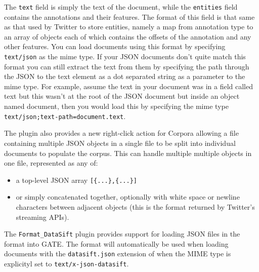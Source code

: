 The \texttt{text} field is simply the text of the document, while the
\texttt{entities} field contains the annotations and their features. The
format of this field is that same as that used by Twitter to store entities,
namely a map from annotation type to an array of objects each of which contains
the offsets of the annotation and any other features. You can load documents
using this format by specifying \texttt{text/json} as the mime type. If your
JSON documents don't quite match this format you can still extract the text
from them by specifying the path through the JSON to the text element as a
dot separated string as a parameter to the mime type. For example, assume
the text in your document was in a field called text but this wasn't at the
root of the JSON document but inside an object named document, then you would
load this by specifying the mime type \texttt{text/json;text-path=document.text}.

The plugin also provides a new right-click action for Corpora allowing a file
containing multiple JSON objects in a single file to be split into individual
documents to populate the corpus. This can handle multiple multiple objects
in one file, represented as any of:
\begin{itemize}
\item a top-level JSON array \verb![{...},{...}]!
\item or simply concatenated together, optionally with white space or newline
  characters between adjacent objects (this is the format returned by Twitter's
  streaming APIs).
\end{itemize}

%
%
The \verb!Format_DataSift! plugin provides support for loading JSON files in the
 format into GATE. The format will
automatically be used when loading documents with the \verb!datasift.json!
extension of when the MIME type is explicityl set to \verb!text/x-json-datasift!.

